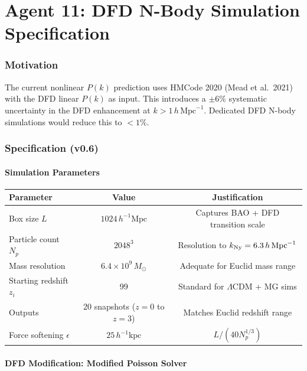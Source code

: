 \documentclass[11pt,a4paper]{article}
\begin{document}
\part{Agent 11: DFD N-Body Simulation Specification}
\label{part:nbody}

\section{Motivation}

The current nonlinear $P(k)$ prediction uses HMCode 2020 (Mead et al.\ 2021) with the DFD linear $P(k)$ as input. This introduces a $\pm 6\%$ systematic uncertainty in the DFD enhancement at $k > 1\,h\,\mathrm{Mpc}^{-1}$. Dedicated DFD N-body simulations would reduce this to $< 1\%$.

\section{Specification (v0.6)}

\subsection{Simulation Parameters}

\begin{center}
\begin{tabular}{lcc}
\toprule
\textbf{Parameter} & \textbf{Value} & \textbf{Justification} \\
\midrule
Box size $L$ & $1024\,h^{-1}\mathrm{Mpc}$ & Captures BAO + DFD transition scale \\
Particle count $N_p$ & $2048^3$ & Resolution to $k_{\rm Ny} = 6.3\,h\,\mathrm{Mpc}^{-1}$ \\
Mass resolution & $6.4 \times 10^9\,M_\odot$ & Adequate for Euclid mass range \\
Starting redshift $z_i$ & 99 & Standard for $\Lambda$CDM + MG sims \\
Outputs & 20 snapshots ($z = 0$ to $z = 3$) & Matches Euclid redshift range \\
Force softening $\epsilon$ & $25\,h^{-1}\mathrm{kpc}$ & $L/(40 N_p^{1/3})$ \\
\bottomrule
\end{tabular}
\end{center}

\subsection{DFD Modification: Modified Poisson Solver}
\end{document}
